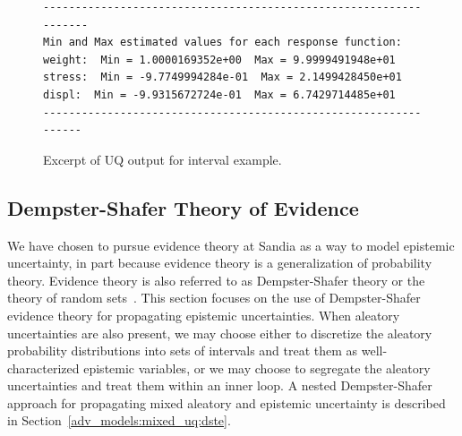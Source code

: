 \begin{figure}[htbp!]
\centering
\begin{bigbox}
\begin{small}
\begin{verbatim}
------------------------------------------------------------------
Min and Max estimated values for each response function:
weight:  Min = 1.0000169352e+00  Max = 9.9999491948e+01
stress:  Min = -9.7749994284e-01  Max = 2.1499428450e+01
displ:  Min = -9.9315672724e-01  Max = 6.7429714485e+01
-----------------------------------------------------------------
\end{verbatim}
\end{small}
\end{bigbox}
\caption{Excerpt of UQ output for interval example.}
\label{uq:examples:interval_out}
\end{figure}


\subsection{Dempster-Shafer Theory of Evidence}\label{uq:dempshaf}

We have chosen to pursue evidence theory at Sandia as a way to model
epistemic uncertainty, in part because evidence theory is a
generalization of probability theory. Evidence theory is also
referred to as Dempster-Shafer theory or the theory of random
sets~\cite{Obe03}. This section focuses on the use of Dempster-Shafer
evidence theory for propagating epistemic uncertainties. When
aleatory uncertainties are also present, we may choose either to
discretize the aleatory probability distributions into sets of
intervals and treat them as well-characterized epistemic variables, or
we may choose to segregate the aleatory uncertainties and treat them
within an inner loop. A nested Dempster-Shafer approach for
propagating mixed aleatory and epistemic uncertainty is described in
Section~\ref{adv_models:mixed_uq:dste}.

